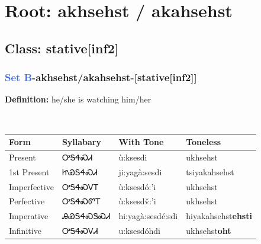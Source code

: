 \needspace{4in}
\section*{Root: akhsehst / akahsehst}
\nopagebreak
{}
\needspace{3in}
\subsection*{Class: stative[inf2]}
\nopagebreak
\needspace{2in}
\subsubsection*{\textcolor{RoyalBlue}{Set B}{-}\textbf{akhsehst/akahsehst}{-}[stative[inf2]]}
\nopagebreak
\textbf{Definition: } he/she is watching him/her
\\[0.5em]
\begin{tabularx}{\textwidth}{l X X X}%
\toprule%
\textbf{Form}&\textbf{Syllabary}&\textbf{With Tone}&\textbf{Toneless}\\%
\midrule%
Present&ᎤᎦᏎᏍᏗ&ù:ksesdi&ukhsehst\textbf{}\\%
1st Present&ᏥᏯᎦᏎᏍᏗ&ji:yagà:sesdi&tsiyakahsehst\textbf{}\\%
Imperfective&ᎤᎦᏎᏍᏙᎢ&ù:ksesdó:’i&ukhsehst\textbf{}\\%
Perfective&ᎤᎦᏎᏍᏛᎢ&ù:ksesdv̌:’i&ukhsehst\textbf{}\\%
Imperative&ᎯᏯᎦᏎᏍᏕᏍᏗ&hi:yagà:sesdé:sdi&hiyakahsehst\textbf{ehsti}\\%
Infinitive&ᎤᎦᏎᏍᏙᏗ&u:ksesdóhdi&ukhsehst\textbf{oht}\\%
\bottomrule%
\end{tabularx}
\\[1em]